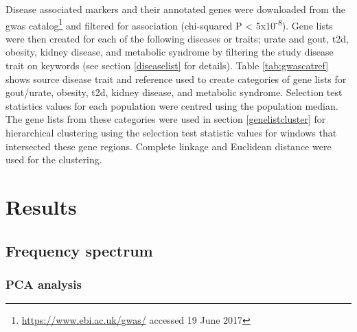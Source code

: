 \documentclass[twoside,openright]{report}
\begin{document}
Disease associated markers and their annotated genes were downloaded
from the \gls{gwas} catalog\footnote{\url{https://www.ebi.ac.uk/gwas/}
  accessed 19 June 2017} \citep{MacArthur2017} and filtered for
association (chi-squared P \textless{} 5x10\textsuperscript{-8}). Gene
lists were then created for each of the following diseases or traits;
urate and gout, \gls{t2d}, obesity, kidney disease, and metabolic
syndrome by filtering the study disease trait on keywords (see section
\ref{diseaselist} for details). Table \ref{tab:gwascatref} shows source
disease trait and reference used to create categories of gene lists for
gout/urate, obesity, \gls{t2d}, kidney disease, and metabolic syndrome.
Selection test statistics values for each population were centred using
the population median. The gene lists from these categories were used in
section \ref{genelistcluster} for hierarchical clustering using the
selection test statistic values for windows that intersected these gene
regions. Complete linkage and Euclidean distance were used for the
clustering.




\section{Results}\label{results-1}

\subsection{Frequency spectrum}\label{frequency-spectrum-1}

\subsubsection{PCA analysis}\label{pcaresults}
\end{document}
